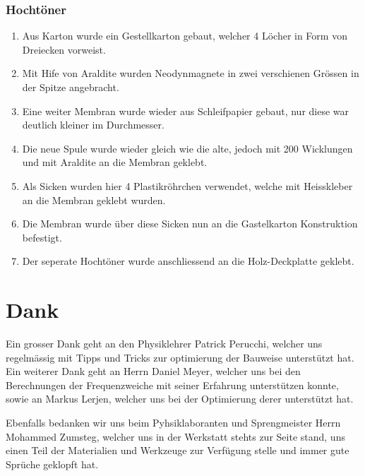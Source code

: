 \documentclass[a4paper,11pt]{report}
\begin{document}
\subsection{Hochtöner}
\begin{enumerate}
    \item Aus Karton wurde ein Gestellkarton gebaut, welcher 4 Löcher in Form von Dreiecken vorweist.
    \item Mit Hife von Araldite wurden Neodynmagnete in zwei verschienen Grössen in der Spitze angebracht.
    \item Eine weiter Membran wurde wieder aus Schleifpapier gebaut, nur diese war deutlich kleiner im Durchmesser.
    \item Die neue Spule wurde wieder gleich wie die alte, jedoch mit 200 Wicklungen und mit Araldite an die Membran geklebt.
    \item Als Sicken wurden hier 4 Plastikröhrchen verwendet, welche mit Heisskleber an die Membran geklebt wurden.
    \item Die Membran wurde über diese Sicken nun an die Gastelkarton Konstruktion befestigt.
    \item Der seperate Hochtöner wurde anschliessend an die Holz-Deckplatte geklebt.
\end{enumerate}

\chapter*{Dank}
Ein grosser Dank geht an den Physiklehrer Patrick Perucchi, welcher uns regelmässig mit Tipps und Tricks zur optimierung der Bauweise unterstützt hat.
Ein weiterer Dank geht an Herrn Daniel Meyer, welcher uns bei den Berechnungen der Frequenzweiche mit seiner Erfahrung unterstützen konnte, sowie an Markus Lerjen, welcher uns bei der Optimierung derer unterstützt hat.

Ebenfalls bedanken wir uns beim Pyhsiklaboranten und Sprengmeister Herrn Mohammed Zumsteg, welcher uns in der Werkstatt stehts zur Seite stand, uns einen Teil der Materialien und Werkzeuge zur Verfügung stelle und immer gute Sprüche geklopft hat.

\newpage
\listoffigures

\newpage


\end{document}
